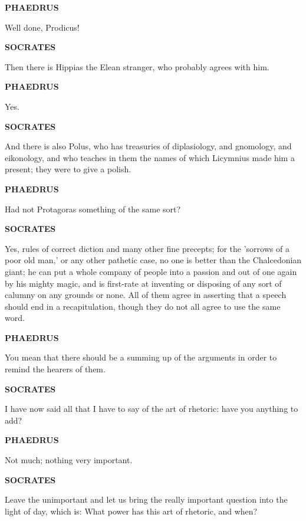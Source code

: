 \documentclass[11pt,letter]{article}
\begin{document}
\par \textbf{PHAEDRUS}
\par   Well done, Prodicus!

\par \textbf{SOCRATES}
\par   Then there is Hippias the Elean stranger, who probably agrees with him.

\par \textbf{PHAEDRUS}
\par   Yes.

\par \textbf{SOCRATES}
\par   And there is also Polus, who has treasuries of diplasiology, and gnomology, and eikonology, and who teaches in them the names of which Licymnius made him a present; they were to give a polish.

\par \textbf{PHAEDRUS}
\par   Had not Protagoras something of the same sort?

\par \textbf{SOCRATES}
\par   Yes, rules of correct diction and many other fine precepts; for the 'sorrows of a poor old man,' or any other pathetic case, no one is better than the Chalcedonian giant; he can put a whole company of people into a passion and out of one again by his mighty magic, and is first-rate at inventing or disposing of any sort of calumny on any grounds or none. All of them agree in asserting that a speech should end in a recapitulation, though they do not all agree to use the same word.

\par \textbf{PHAEDRUS}
\par   You mean that there should be a summing up of the arguments in order to remind the hearers of them.

\par \textbf{SOCRATES}
\par   I have now said all that I have to say of the art of rhetoric:  have you anything to add?

\par \textbf{PHAEDRUS}
\par   Not much; nothing very important.

\par \textbf{SOCRATES}
\par   Leave the unimportant and let us bring the really important question into the light of day, which is:  What power has this art of rhetoric, and when?
\end{document}
